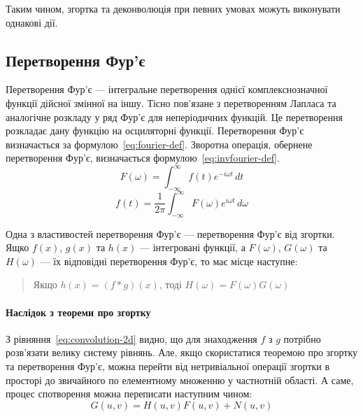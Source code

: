 \documentclass{diploma}
\begin{document}
        Таким чином, згортка та деконволюція при певних умовах можуть виконувати
        однакові дії.
      \clearpage
    \subsection{Перетворення Фур’є}
      Перетворення Фур’є --- інтегральне перетворення однієї комплекснозначної
      функції дійсної змінної на іншу.
      Тісно пов’язане з перетворенням Лапласа та аналогічне розкладу у ряд
      Фур’є для неперіодичних функцій.
      Це перетворення розкладає дану функцію на осциляторні функції.
      Перетворення Фур’є визначається за формулою~\eqref{eq:fourier-def}.
      Зворотна операція, обернене перетворення Фур’є, визначається
      формулою~\eqref{eq:invfourier-def}.
      \begin{equation}
        F\left( \omega \right) = \int_{-\infty}^\infty f\left( t \right) e^{-i
        \omega t }\,dt
        \label{eq:fourier-def}
      \end{equation}
      \begin{equation}
        f\left( t \right) = \frac{1}{2 \pi} \int_{-\infty}^\infty F\left(
        \omega \right) e^{i \omega t}\, d\omega
        \label{eq:invfourier-def}
      \end{equation}

      Одна з властивостей перетворення Фур’є --- перетворення Фур’є від
      згортки.
      Ящко $f\left( x \right)$, $g\left( x \right)$ та $h\left( x \right)$ ---
      інтегровані функції, а $F\left( \omega \right)$, $G\left( \omega
      \right)$
      та $H\left( \omega \right)$ --- їх відповідні перетворення Фур’є, то має
      місце наступне:
      \begin{quote}
        Якщо $h\left( x \right) = \left( f \ast g \right)\left( x \right)$,
        тоді $H\left( \omega \right) = F\left( \omega \right) G\left( \omega
        \right)$
      \end{quote}
      \paragraph{Наслідок з теореми про згортку}
        З рівняння~\eqref{eq:convolution-2d} видно, що для знаходження $f$ з $g$
        потрібно розв’язати велику систему рівнянь.
        Але, якщо скористатися теоремою про згортку та перетворення Фур’є,
        можна перейти від нетривіальної операції згортки в просторі до
        звичайного по елементному множенню у частнотній області.
        А саме, процес спотворення можна переписати наступним чином:
        \begin{equation}
          G\left( u, v \right) = H\left( u, v \right) F\left( u, v \right) +
          N\left( u, v \right)
          \label{eq:deffect-fourier}
        \end{equation}
      \clearpage
\end{document}
